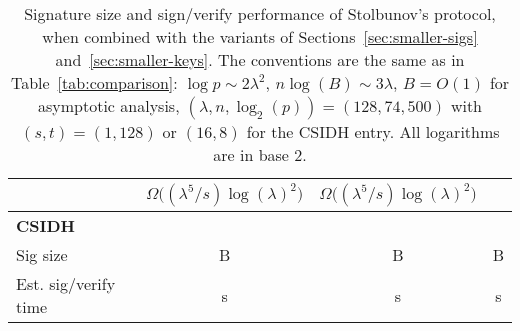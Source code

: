 \documentclass{llncs}
\begin{document}
\begin{table}
\begin{tabular}{l | c | c | c |}
    & $\Omega\bigl((\lambda^5/s)\log(\lambda)^2\bigr)$
    & $\Omega\bigl((\lambda^5/s)\log(\lambda)^2\bigr)$\\
    \hline
    \hspace{1em}\textbf{CSIDH} &&&\\
    Sig size             & \StoSig{} B & \ParSig{} B & \ComSig{} B\\
    Est. sig/verify time & \StoTime{} s & \ParTime{} s & \ComTime{} s
  \end{tabular}
  \caption{Signature size and sign/verify performance of Stolbunov's
    protocol, when combined with the variants of
    Sections~\ref{sec:smaller-sigs} and~\ref{sec:smaller-keys}.  The
    conventions are the same as in Table~\ref{tab:comparison}:
    $\log p \sim 2\lambda^2$, $n\log(B)\sim 3\lambda$, $B = O(1)$ for
    asymptotic analysis,
    $(\lambda,n,\log_2(p)) = (128, 74, 500)$ with
    $(s,t) = (1,128)$ or $(16,8)$ for the CSIDH entry.  All logarithms
    are in base 2.}
  \label{tab:stolbunov}
\end{table}
\end{document}
